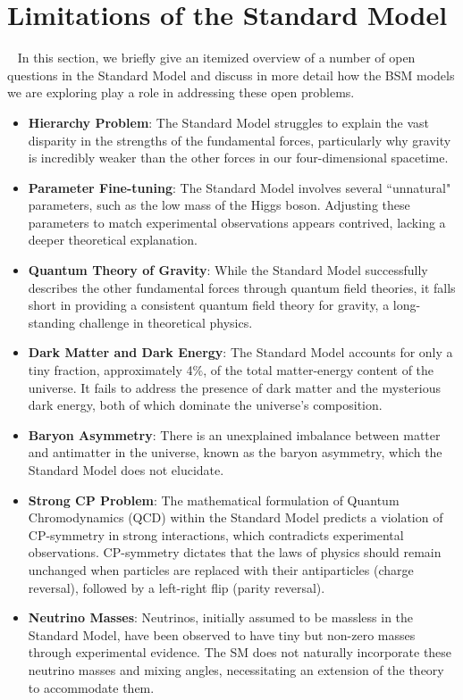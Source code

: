 \section{Limitations of the Standard Model}~\label{sec:SMLimitations}
In this section, we briefly give an itemized overview of a number of open questions in the Standard Model and discuss in more detail how the BSM models we are exploring play a role in addressing these open problems. 
\begin{itemize}
    \item  \textbf{Hierarchy Problem}: The Standard Model struggles to explain the vast disparity in the strengths of the fundamental forces, particularly why gravity is incredibly weaker than the other forces in our four-dimensional spacetime.
    \item \textbf{Parameter Fine-tuning}: The Standard Model involves several ``unnatural" parameters, such as the low mass of the Higgs boson. Adjusting these parameters to match experimental observations appears contrived, lacking a deeper theoretical explanation.
    \item  \textbf{Quantum Theory of Gravity}: While the Standard Model successfully describes the other fundamental forces through quantum field theories, it falls short in providing a consistent quantum field theory for gravity, a long-standing challenge in theoretical physics.
    \item \textbf{Dark Matter and Dark Energy}: The Standard Model accounts for only a tiny fraction, approximately 4$\%$, of the total matter-energy content of the universe. It fails to address the presence of dark matter and the mysterious dark energy, both of which dominate the universe's composition.
    \item \textbf{Baryon Asymmetry}: There is an unexplained imbalance between matter and antimatter in the universe, known as the baryon asymmetry, which the Standard Model does not elucidate.
    \item \textbf{Strong CP Problem}: The mathematical formulation of Quantum Chromodynamics (QCD) within the Standard Model predicts a violation of CP-symmetry in strong interactions, which contradicts experimental observations. CP-symmetry dictates that the laws of physics should remain unchanged when particles are replaced with their antiparticles (charge reversal), followed by a left-right flip (parity reversal).
    \item \textbf{Neutrino Masses}: Neutrinos, initially assumed to be massless in the Standard Model, have been observed to have tiny but non-zero masses through experimental evidence. The SM does not naturally incorporate these neutrino masses and mixing angles, necessitating an extension of the theory to accommodate them.
    
\end{itemize}

